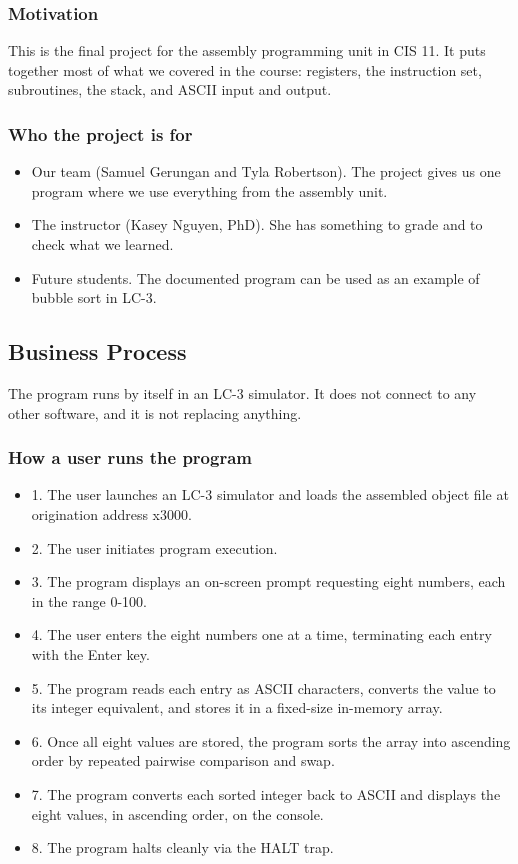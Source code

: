 \documentclass[11pt]{article}
\begin{document}
\subsubsection*{Motivation}

This is the final project for the assembly programming unit in CIS 11. It puts together most of what we covered in the course: registers, the instruction set, subroutines, the stack, and ASCII input and output.


\subsubsection*{Who the project is for}

\begin{itemize}
  \item Our team (Samuel Gerungan and Tyla Robertson). The project gives us one program where we use everything from the assembly unit.
  \item The instructor (Kasey Nguyen, PhD). She has something to grade and to check what we learned.
  \item Future students. The documented program can be used as an example of bubble sort in LC-3.
\end{itemize}

\subsection*{Business Process}

The program runs by itself in an LC-3 simulator. It does not connect to any other software, and it is not replacing anything.


\subsubsection*{How a user runs the program}

\begin{itemize}
  \item 1. The user launches an LC-3 simulator and loads the assembled object file at origination address x3000.
  \item 2. The user initiates program execution.
  \item 3. The program displays an on-screen prompt requesting eight numbers, each in the range 0-100.
  \item 4. The user enters the eight numbers one at a time, terminating each entry with the Enter key.
  \item 5. The program reads each entry as ASCII characters, converts the value to its integer equivalent, and stores it in a fixed-size in-memory array.
  \item 6. Once all eight values are stored, the program sorts the array into ascending order by repeated pairwise comparison and swap.
  \item 7. The program converts each sorted integer back to ASCII and displays the eight values, in ascending order, on the console.
  \item 8. The program halts cleanly via the HALT trap.
\end{itemize}
\end{document}
